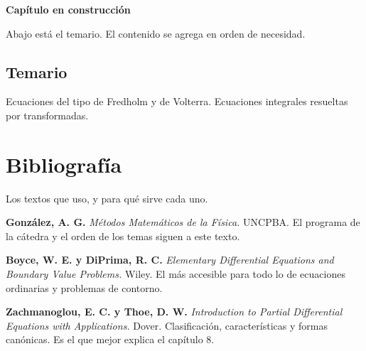 \documentclass[
  spanish,
  a4paper,
]{scrbook}
\theoremstyle{definition}
\theoremstyle{plain}
\theoremstyle{definition}
\theoremstyle{plain}
\theoremstyle{definition}
\theoremstyle{remark}
\begin{document}
\begin{tcolorbox}[enhanced jigsaw, arc=.35mm, bottomrule=.15mm, breakable, colback=white, colframe=quarto-callout-note-color-frame, left=2mm, leftrule=.75mm, opacityback=0, rightrule=.15mm, toprule=.15mm]
\begin{minipage}[t]{5.5mm}
\textcolor{quarto-callout-note-color}{\faInfo}
\end{minipage}%
\begin{minipage}[t]{\textwidth - 5.5mm}

\vspace{-3mm}\textbf{Capítulo en construcción}\vspace{3mm}

Abajo está el temario. El contenido se agrega en orden de necesidad.

\end{minipage}%
\end{tcolorbox}

\section*{Temario}\label{temario-11}


Ecuaciones del tipo de Fredholm y de Volterra. Ecuaciones integrales
resueltas por transformadas.


\chapter*{Bibliografía}\label{bibliografuxeda}


Los textos que uso, y para qué sirve cada uno.

\textbf{González, A. G.} \emph{Métodos Matemáticos de la Física.}
UNCPBA. El programa de la cátedra y el orden de los temas siguen a este
texto.

\textbf{Boyce, W. E. y DiPrima, R. C.} \emph{Elementary Differential
Equations and Boundary Value Problems.} Wiley. El más accesible para
todo lo de ecuaciones ordinarias y problemas de contorno.

\textbf{Zachmanoglou, E. C. y Thoe, D. W.} \emph{Introduction to Partial
Differential Equations with Applications.} Dover. Clasificación,
características y formas canónicas. Es el que mejor explica el capítulo
8.
\end{document}
